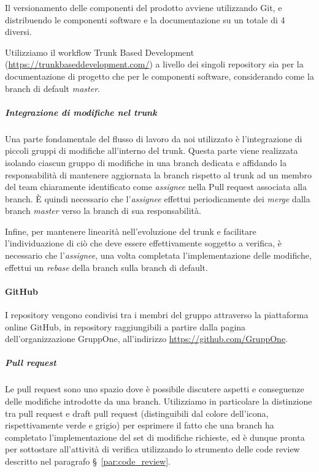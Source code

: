\documentclass[../../norme-di-progetto.tex]{subfiles}
\begin{document}
Il versionamento delle componenti del prodotto avviene utilizzando Git, e distribuendo le componenti software e la documentazione su un totale di 4  diversi.

Utilizziamo il workflow Trunk Based Development (\href{https://trunkbaseddevelopment.com/}{https://trunkbaseddevelopment.com/}) a livello dei singoli repository sia per la documentazione di progetto che per le componenti software, considerando come  la branch di default \textit{master}.

\subparagraph{Integrazione di modifiche nel trunk}%
\label{subp:integrazione_di_modifiche_nel_trunk}

Una parte fondamentale del flusso di lavoro da noi utilizzato è l'integrazione di piccoli gruppi di modifiche all'interno del trunk.
Questa parte viene realizzata isolando ciascun gruppo di modifiche in una branch dedicata e affidando la responsabilità di mantenere aggiornata la branch rispetto al trunk ad un membro del team chiaramente identificato come \textit{assignee} nella Pull request associata alla branch. È quindi necessario che l'\textit{assignee} effettui periodicamente dei \textit{merge} dalla branch \textit{master} verso la branch di sua responsabilità.

Infine, per mantenere linearità nell'evoluzione del trunk e facilitare l'individuazione di ciò che deve essere effettivamente soggetto a verifica, è necessario che l'\textit{assignee}, una volta completata l'implementazione delle modifiche, effettui un \textit{rebase} della branch sulla branch di default.



\paragraph{GitHub}%
\label{par:github}

I repository vengono condivisi tra i membri del gruppo attraverso la piattaforma online GitHub, in repository raggiungibili a partire dalla pagina dell'organizzazione GruppOne, all'indirizzo \href{https://github.com/GruppOne}{https://github.com/GruppOne}.

\subparagraph{Pull request}%
\label{subp:pull_request}

Le pull request sono uno spazio dove è possibile discutere aspetti e conseguenze delle modifiche introdotte da una branch. Utilizziamo in particolare la distinzione tra pull request e draft pull request (distinguibili dal colore dell'icona, rispettivamente verde e grigio) per esprimere il fatto che una branch ha completato l'implementazione del set di modifiche richieste, ed è dunque pronta per sottostare all'attività di verifica utilizzando lo strumento delle code review descritto nel paragrafo §~\ref{par:code_review}.
\end{document}
